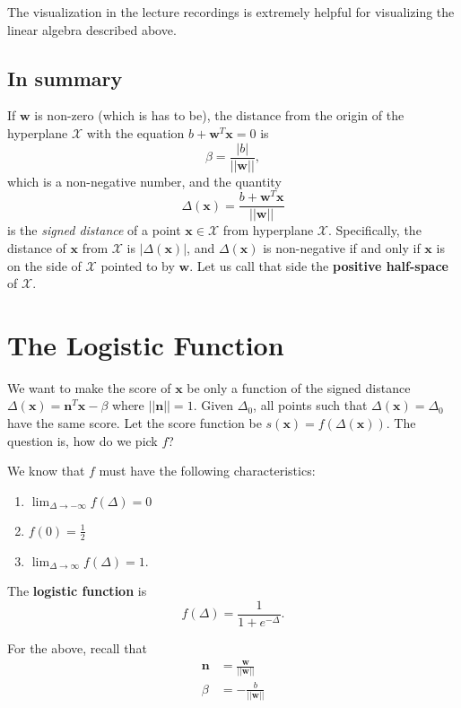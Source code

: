 \documentclass[titlepage, 12pt, leqno]{article}
\begin{document}
\begin{note}
    The visualization in the lecture recordings is extremely helpful for visualizing the
    linear algebra described above.
\end{note}

\subsection{In summary}
If $\textbf{w}$ is non-zero (which is has to be), the distance from the origin of the
hyperplane $\mathcal{X}$ with the equation $b+\textbf{w}^{T}\textbf{x}=0$ is
\[
\beta = \frac{|b|}{||\textbf{w}||},
\]
which is a non-negative number, and the quantity
\[
\Delta(\textbf{x}) = \frac{b+\textbf{w}^{T}\textbf{x}}{||\textbf{w}||}
\]
is the \textit{signed distance} of a point $\textbf{x}\in \mathcal{X}$ from hyperplane
$\mathcal{X}$. Specifically, the distance of $\textbf{x}$ from $\mathcal{X}$ is
$|\Delta(\textbf{x})|$, and $\Delta(\textbf{x})$ is non-negative if and only if
$\textbf{x}$ is on the side of $\mathcal{X}$ pointed to by $\textbf{w}$. Let us call
that side the \textbf{positive half-space} of $\mathcal{X}$.

\pagebreak
\section{The Logistic Function}
We want to make the score of $\textbf{x}$ be only a function of the signed distance
$\Delta(\textbf{x})=\textbf{n}^{T}\textbf{x}-\beta$ where $||\textbf{n}|| =1$. Given
$\Delta_{0}$, all points such that $\Delta(\textbf{x}) = \Delta_{0}$ have the same score.
Let the score function be $s(\textbf{x}) = f(\Delta(\textbf{x}))$. The question is, how
do we pick $f$?

We know that $f$ must have the following characteristics:
\begin{enumerate}
    \item $\lim_{\Delta \to -\infty} f(\Delta)=0$
    \item $f(0)=\frac{1}{2}$ 
    \item $\lim_{\Delta \to \infty} f(\Delta)=1$.
\end{enumerate}

The \textbf{logistic function} is
\[
    f(\Delta) = \frac{1}{1+e^{-\Delta}}.
\]
\begin{note}
    For the above, recall that
    \begin{align*}
        \textbf{n} &= \frac{\textbf{w}}{||\textbf{w}||}\\
        \beta &= -\frac{b}{||\textbf{w}||}
    \end{align*}
\end{note}
\end{document}
